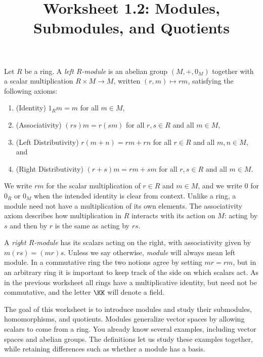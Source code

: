 \documentclass[12pt,reqno]{amsart}
\title{Worksheet 1.2: Modules, Submodules, and Quotients}
\begin{document}
\maketitle
\thispagestyle{firstpage}

Let $R$ be a ring. A \emph{left $R$-module} is an abelian group $(M,+,0_M)$ together with a scalar multiplication $R\times M\to M$, written $(r,m)\mapsto rm$, satisfying the following axioms:
\begin{enumerate}[label=(\roman*)]
\item (Identity) $1_Rm=m$ for all $m\in M$,
\item (Associativity) $(rs)m=r(sm)$ for all $r,s\in R$ and all $m\in M$,
\item (Left Distributivity) $r(m+n)=rm+rn$ for all $r\in R$ and all $m,n\in M$, and
\item (Right Distributivity) $(r+s)m=rm+sm$ for all $r,s\in R$ and all $m\in M$.
\end{enumerate}
We write $rm$ for the scalar multiplication of $r\in R$ and $m\in M$, and we write $0$ for $0_R$ or $0_M$ when the intended identity is clear from context. Unlike a ring, a module need not have a multiplication of its own elements. The associativity axiom describes how multiplication in $R$ interacts with its action on $M$: acting by $s$ and then by $r$ is the same as acting by $rs$.

A \emph{right $R$-module} has its scalars acting on the right, with associativity given by $m(rs)=(mr)s$. Unless we say otherwise, \emph{module} will always mean left module. In a commutative ring the two notions agree by setting $mr=rm$, but in an arbitrary ring it is important to keep track of the side on which scalars act. As in the previous worksheet all rings have a multiplicative identity, but need not be commutative, and the letter $\KK$ will denote a field.

The goal of this worksheet is to introduce modules and study their submodules, homomorphisms, and quotients. Modules generalize vector spaces by allowing scalars to come from a ring. You already know several examples, including vector spaces and abelian groups. The definitions let us study these examples together, while retaining differences such as whether a module has a basis. 

\hrulefill
\end{document}

